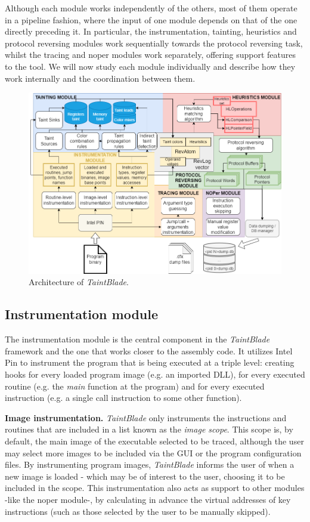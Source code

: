 \documentclass[conference]{IEEEtran}
\begin{document}
Although each module works independently of the others, most of them operate in
a pipeline fashion, where the input of one module depends on that of the one
directly preceding it. In particular, the instrumentation, tainting, heuristics
and protocol reversing modules work sequentially towards the protocol reversing
task, whilst the tracing and noper modules work separately, offering support
features to the tool. We will now study each module individually and describe
how they work internally and the coordination between them.

\begin{figure}
    \centerline{\includegraphics[width=\textwidth]{images/archdetailedsteps.drawio.png}}
    \caption{Architecture of \textit{TaintBlade}.}
    \label{figure:fig_3_archdetailedsteps}
\end{figure}

\subsection{Instrumentation module}
The instrumentation module is the central component in the \textit{TaintBlade}
framework and the one that works closer to the assembly code. It utilizes Intel
Pin to instrument the program that is being executed at a triple level:
creating hooks for every loaded program image (e.g. an imported DLL), for every
executed routine (e.g. the \textit{main} function at the program) and for every
executed instruction (e.g. a single call instruction to some other function).

\textbf{Image instrumentation.}
\textit{TaintBlade} only instruments the instructions and routines that are included
in a list known as the \textit{image scope}. This scope is, by default, the main image of the executable
selected to be traced, although the user may select more images to be included via the GUI or
the program configuration files. By instrumenting program images, \textit{TaintBlade} informs the
user of when a new image is loaded - which may be of interest to the user, choosing it to be included
in the scope. This instrumentation also acts as support to other modules -like the noper module-, by calculating in
advance the virtual addresses of key instructions (such as those selected by the user to be manually skipped).
\end{document}
